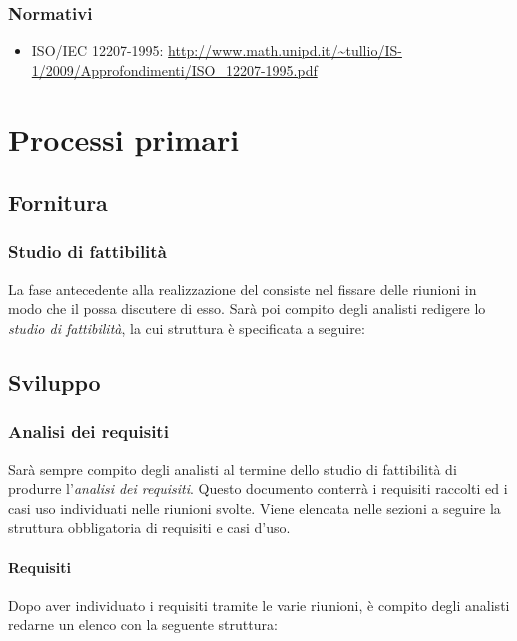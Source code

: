 		\subsubsection{Normativi}
		\begin{itemize}
		\item ISO/IEC 12207-1995: \url{http://www.math.unipd.it/\~tullio/IS-1/2009/Approfondimenti/ISO_12207-1995.pdf}
		\end{itemize}




\section{Processi primari}

\subsection{Fornitura}

	\subsubsection{Studio di fattibilità}
	La fase antecedente alla realizzazione del  consiste nel fissare delle riunioni in modo che il  possa discutere di esso. Sarà poi compito degli analisti redigere lo \textit{studio di fattibilità}, la cui struttura è specificata a seguire: %

\subsection{Sviluppo}
	\subsubsection{Analisi dei requisiti}
	Sarà sempre compito degli analisti al termine dello studio di fattibilità di produrre l'\textit{analisi dei requisiti}. Questo documento conterrà i requisiti raccolti ed i casi uso individuati nelle riunioni svolte.
	Viene elencata nelle sezioni a seguire la struttura obbligatoria di requisiti e casi d'uso.
		\paragraph{Requisiti}%
		Dopo aver individuato i requisiti tramite le varie riunioni, è compito degli analisti redarne un elenco con la seguente struttura:
		
